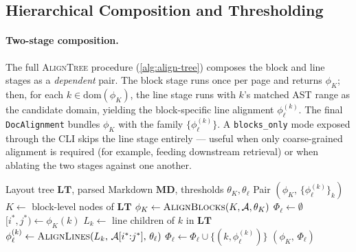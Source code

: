 \documentclass{article}
\theoremstyle{definition}
\newcommand{\LT}{\mathbf{LT}}
\newcommand{\MD}{\mathbf{MD}}
\begin{document}
\subsection{Hierarchical Composition and Thresholding}
\label{sec:compose}

\paragraph{Two-stage composition.}
The full \textsc{AlignTree} procedure (\cref{alg:align-tree})
composes the block and line stages as a \emph{dependent} pair.  The
block stage runs once per page and returns $\phi_K$; then, for each
$k \in \mathrm{dom}(\phi_K)$, the line stage runs with $k$'s matched
AST range as the candidate domain, yielding the block-specific line
alignment $\phi_\ell^{(k)}$.  The final
\texttt{DocAlignment} bundles $\phi_K$ with the family
$\{\phi_\ell^{(k)}\}$.  A \texttt{blocks\_only} mode exposed through
the CLI skips the line stage entirely --- useful when only
coarse-grained alignment is required (for example, feeding downstream
retrieval) or when ablating the two stages against one another.

\begin{algorithm}[h]
      \caption{Hierarchical multimodal alignment (\textsc{AlignTree})}
      \label{alg:align-tree}
      \begin{algorithmic}[1]
            \Require Layout tree $\LT$, parsed Markdown $\MD$, thresholds
            $\theta_K,\theta_\ell$
            \Ensure Pair $(\phi_K,\, \{\phi_\ell^{(k)}\}_k)$
            \State $K \gets$ block-level nodes of $\LT$
            \State $\phi_K \gets \textsc{AlignBlocks}(K, \mathcal{A}, \theta_K)$
            \State $\Phi_\ell \gets \emptyset$
            \State $[i^{*}, j^{*}) \gets \phi_K(k)$
            \State $L_k \gets$ line children of $k$ in $\LT$
            \State $\phi_\ell^{(k)} \gets \textsc{AlignLines}(L_k,\, \mathcal{A}[i^{*}{:}j^{*}],\, \theta_\ell)$
            \State $\Phi_\ell \gets \Phi_\ell \cup \{(k, \phi_\ell^{(k)})\}$
            \EndFor
            \State \Return $(\phi_K,\, \Phi_\ell)$
      \end{algorithmic}
\end{algorithm}
\end{document}
